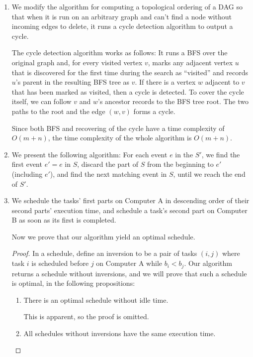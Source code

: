 \documentclass{article}
\begin{document}
\begin{enumerate}
\item We modify the algorithm for computing a topological ordering of a DAG so that when it is run on an arbitrary graph and can't find a node without incoming edges to delete, it runs a cycle detection algorithm to output a cycle.

The cycle detection algorithm works as follows: It runs a BFS over the original graph and, for every visited vertex $v$, marks any adjacent vertex $u$ that is discovered for the first time during the search as ``visited'' and records $u$'s parent in the resulting BFS tree as $v$. If there is a vertex $w$ adjacent to $v$ that has been marked as visited, then a cycle is detected. To cover the cycle itself, we can follow $v$ and $w$'s ancestor records to the BFS tree root. The two paths to the root and the edge $(w, v)$ forms a cycle.

Since both BFS and recovering of the cycle have a time complexity of $O(m + n)$, the time complexity of the whole algorithm is $O(m + n)$.

\item We present the following algorithm: For each event $e$ in the $S'$, we find the first event $e' = e$ in $S$, discard the part of $S$ from the beginning to $e'$ (including $e'$), and find the next matching event in $S$, until we reach the end of $S'$.

\item We schedule the tasks' first parts on Computer A in descending order of their second parts' execution time, and schedule a task's second part on Computer B as soon as its first is completed.

Now we prove that our algorithm yield an optimal schedule.
\begin{proof}
    In a schedule, define an inversion to be a pair of tasks $(i, j)$ where task $i$ is scheduled before $j$ on Computer A while $b_i < b_j$. Our algorithm returns a schedule without inversions, and we will prove that such a schedule is optimal, in the following propositions:
    \begin{enumerate}
        \item There is an optimal schedule without idle time.
        
        This is apparent, so the proof is omitted.
    
        \item All schedules without inversions have the same execution time.
        

\end{enumerate}
\end{proof}
\end{enumerate}
\end{document}
